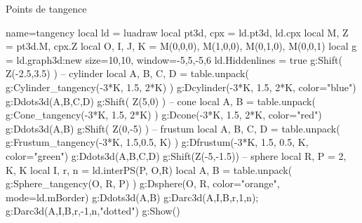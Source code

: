 \begin{demo}{Points de tangence}
\begin{luadraw}{name=tangency}
local ld = luadraw
local pt3d, cpx = ld.pt3d, ld.cpx
local M, Z = pt3d.M, cpx.Z
local O, I, J, K = M(0,0,0), M(1,0,0), M(0,1,0), M(0,0,1)
local g = ld.graph3d:new{ size={10,10}, window={-5,5,-5,6} }
ld.Hiddenlines = true
g:Shift( Z(-2.5,3.5) ) -- cylinder
local A, B, C, D = table.unpack( g:Cylinder_tangency(-3*K, 1.5, 2*K) )
g:Dcylinder(-3*K, 1.5, 2*K, {color="blue"})
g:Ddots3d({A,B,C,D})
g:Shift( Z(5,0) ) -- cone
local A, B = table.unpack( g:Cone_tangency(-3*K, 1.5, 2*K) )
g:Dcone(-3*K, 1.5, 2*K, {color="red"})
g:Ddots3d({A,B})
g:Shift( Z(0,-5) ) -- frustum
local A, B, C, D = table.unpack( g:Frustum_tangency(-3*K, 1.5,0.5, K) )
g:Dfrustum(-3*K, 1.5, 0.5, K, {color="green"})
g:Ddots3d({A,B,C,D})
g:Shift(Z(-5,-1.5)) -- sphere
local R, P = 2, {K, K}
local I, r, n = ld.interPS(P, {O,R})
local A, B = table.unpack( g:Sphere_tangency(O, R, P) )
g:Dsphere(O, R, {color="orange", mode=ld.mBorder})
g:Ddots3d({A,B})
g:Darc3d(A,I,B,r,1,n); g:Darc3d(A,I,B,r,-1,n,"dotted")
g:Show()
\end{luadraw}
\end{demo}
